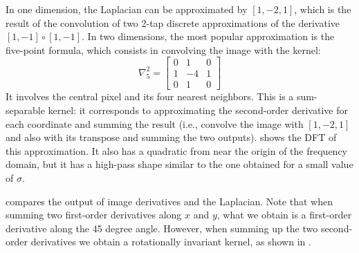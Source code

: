  
 In one dimension, the Laplacian can be approximated by $\left[ 1,-2,1 \right]$, which is the result of the convolution of two 2-tap discrete approximations of the derivative $\left[1,-1 \right] \circ \left[1,-1 \right]$.
In two dimensions, the most popular approximation is the five-point formula, which consists in convolving the image with the kernel:
\begin{equation}
\nabla_5^2 = 
\begin{bmatrix}
  0& 1 & 0 \\
  1 & -4 & 1\\
  0 &  1 & 0
\end{bmatrix}
\label{eq:five_point_laplacian}
\end{equation}
It involves the central pixel and its four nearest neighbors. This is a sum-separable kernel: it corresponds to approximating the second-order derivative for each coordinate and summing the result (i.e., convolve the image with $\left[1,-2,1\right]$ and also with its transpose and summing the two outputs). 
 shows the DFT of this approximation. It also has a quadratic from near the origin of the frequency domain, but it has a high-pass shape similar to the one obtained for a small value of $\sigma$.



\Fig{\ref{fig:wheellaplacian}} compares the output of image derivatives and the Laplacian. Note that when summing two first-order derivatives along $x$ and $y$, what we obtain is a first-order derivative along the 45 degree angle. However, when summing up the two second-order derivatives we obtain a rotationally invariant kernel, as shown in .


